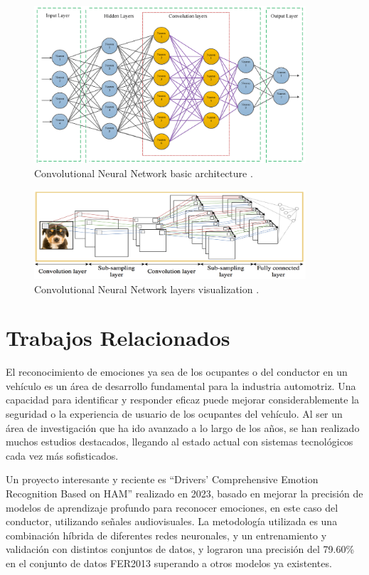 \documentclass[12pt]{report} %
\begin{document}
\begin{figure}[H]
	\centering
	\includegraphics[width=0.9\textwidth]{cnnStructure.png}
	\caption{Convolutional Neural Network basic architecture \cite{annReview}.}
	\label{fig:imagen27}
\end{figure}

\begin{figure}[H]
	\centering
	\includegraphics[width=0.9\textwidth]{basicCnn.png}
	\caption{Convolutional Neural Network layers visualization \cite{deepImages}.}
	\label{fig:imagen28}
\end{figure}

\section{Trabajos Relacionados}

El reconocimiento de emociones ya sea de los ocupantes o del conductor en un vehículo es un área de desarrollo fundamental para la industria automotriz. Una capacidad para identificar y responder eficaz puede mejorar considerablemente la seguridad o la experiencia de usuario de los ocupantes del vehículo. Al ser un área de investigación que ha ido avanzado a lo largo de los años, se han realizado muchos estudios destacados, llegando al estado actual con sistemas tecnológicos cada vez más sofisticados.

Un proyecto interesante y reciente es “Drivers’ Comprehensive Emotion Recognition Based on HAM” \cite{rw1} realizado en 2023, basado en mejorar la precisión de modelos de aprendizaje profundo para reconocer emociones, en este caso del conductor, utilizando señales audiovisuales. La metodología utilizada es una combinación híbrida de diferentes redes neuronales, y un entrenamiento y validación con distintos conjuntos de datos, y lograron una precisión del 79.60\% en el conjunto de datos FER2013 superando a otros modelos ya existentes.
\end{document}
